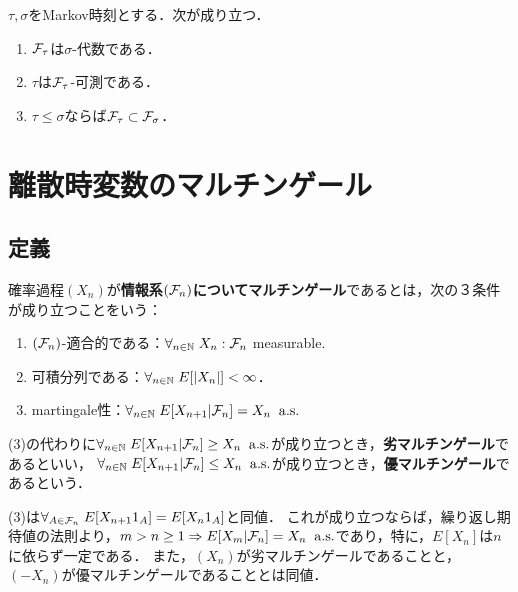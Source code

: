 \documentclass[uplatex,dvipdfmx]{jsreport}
\begin{document}
\begin{theorem}
    $\tau,\sigma$をMarkov時刻とする．次が成り立つ．
    \begin{enumerate}
        \item $\mathcal{F}_\tau$は$\sigma$-代数である．
        \item $\tau$は$\mathcal{F}_\tau$-可測である．
        \item $\tau\le\sigma$ならば$\mathcal{F}_\tau\subset\mathcal{F}_\sigma$．
    \end{enumerate}
\end{theorem}

\section{離散時変数のマルチンゲール}

\subsection{定義}

\begin{definition}
    確率過程$(X_n)$が\textbf{情報系$(\mathcal{F}_n)$についてマルチンゲール}であるとは，次の３条件が成り立つことをいう：
    \begin{enumerate}
        \item $(\mathcal{F}_n)$-適合的である：$\forall_{n\in\mathbb{N}}\;X_n:\mathcal{F}_n$ measurable.
        \item 可積分列である：$\forall_{n\in\mathbb{N}}\;E[\lvert X_n\rvert]<\infty$．
        \item martingale性：$\forall_{n\in\mathbb{N}}\;E[X_{n+1}|\mathcal{F}_n]=X_n\;\;\mathrm{a.s.}$
    \end{enumerate}
    (3)の代わりに$\forall_{n\in\mathbb{N}}\;E[X_{n+1}|\mathcal{F}_n]\ge X_n\;\;\mathrm{a.s.}$が成り立つとき，\textbf{劣マルチンゲール}であるといい，
    $\forall_{n\in\mathbb{N}}\;E[X_{n+1}|\mathcal{F}_n]\le X_n\;\;\mathrm{a.s.}$が成り立つとき，\textbf{優マルチンゲール}であるという．
\end{definition}
\begin{remarks}
    (3)は$\forall_{A\in\mathcal{F}_n}\;E[X_{n+1}1_A]=E[X_n1_A]$と同値．
    これが成り立つならば，繰り返し期待値の法則より，$m>n\ge1\Rightarrow E[X_m|\mathcal{F}_n]=X_n\;\;\mathrm{a.s.}$であり，特に，$E[X_n]$は$n$に依らず一定である．
    また，$(X_n)$が劣マルチンゲールであることと，$(-X_n)$が優マルチンゲールであることとは同値．
\end{remarks}
\end{document}

